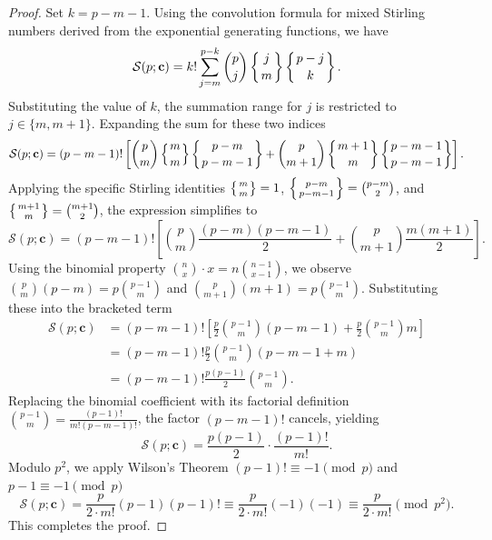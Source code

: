 \documentclass[12pt]{amsart}
\theoremstyle{definition}
\begin{document}
\begin{proof}
Set $k = p-m-1$. Using the convolution formula for mixed Stirling numbers derived from the exponential generating functions, we have
\begin{equation}
    \label{eq:conv_start}
    \mathcal{S}(p; \mathbf{c}) = k! \sum_{j=m}^{p-k} \binom{p}{j} \left\{ \genfrac{}{}{0pt}{}{j}{m} \right\} \left\{ \genfrac{}{}{0pt}{}{p-j}{k} \right\}.
\end{equation}
Substituting the value of $k$, the summation range for $j$ is restricted to $j \in \{m, m+1\}$. Expanding the sum for these two indices
\begin{equation*}
    \mathcal{S}(p; \mathbf{c}) = (p-m-1)! \left[ \binom{p}{m} \left\{ \genfrac{}{}{0pt}{}{m}{m} \right\} \left\{ \genfrac{}{}{0pt}{}{p-m}{p-m-1} \right\} + \binom{p}{m+1} \left\{ \genfrac{}{}{0pt}{}{m+1}{m} \right\} \left\{ \genfrac{}{}{0pt}{}{p-m-1}{p-m-1} \right\} \right].
\end{equation*}
Applying the specific Stirling identities $\left\{ \genfrac{}{}{0pt}{}{m}{m} \right\} = 1$, $\left\{ \genfrac{}{}{0pt}{}{p-m}{p-m-1} \right\} = \binom{p-m}{2}$, and $\left\{ \genfrac{}{}{0pt}{}{m+1}{m} \right\} = \binom{m+1}{2}$, the expression simplifies to
\begin{equation*}
    \mathcal{S}(p; \mathbf{c}) = (p-m-1)! \left[ \binom{p}{m} \frac{(p-m)(p-m-1)}{2} + \binom{p}{m+1} \frac{m(m+1)}{2} \right].
\end{equation*}
Using the binomial property $\binom{n}{x} \cdot x = n \binom{n-1}{x-1}$, we observe $\binom{p}{m}(p-m) = p \binom{p-1}{m}$ and $\binom{p}{m+1}(m+1) = p \binom{p-1}{m}.$
Substituting these into the bracketed term
\begin{align*}
    \mathcal{S}(p; \mathbf{c}) &= (p-m-1)! \left[ \frac{p}{2} \binom{p-1}{m} (p-m-1) + \frac{p}{2} \binom{p-1}{m} m \right] \\
    &= (p-m-1)! \frac{p}{2} \binom{p-1}{m} (p-m-1 + m) \\
    &= (p-m-1)! \frac{p(p-1)}{2} \binom{p-1}{m}.
\end{align*}
Replacing the binomial coefficient with its factorial definition $\binom{p-1}{m} = \frac{(p-1)!}{m!(p-m-1)!}$, the factor $(p-m-1)!$ cancels, yielding
\begin{equation*}
    \mathcal{S}(p; \mathbf{c}) = \frac{p(p-1)}{2} \cdot \frac{(p-1)!}{m!}.
\end{equation*}
Modulo $p^2$, we apply Wilson's Theorem $(p-1)! \equiv -1 \pmod p$ and $p-1 \equiv -1 \pmod p$
\begin{equation*}
    \mathcal{S}(p; \mathbf{c}) = \frac{p}{2 \cdot m!} (p-1)(p-1)! \equiv \frac{p}{2 \cdot m!} (-1)(-1) \equiv \frac{p}{2 \cdot m!} \pmod{p^2}.
\end{equation*}
This completes the proof.
\end{proof}
\end{document}
